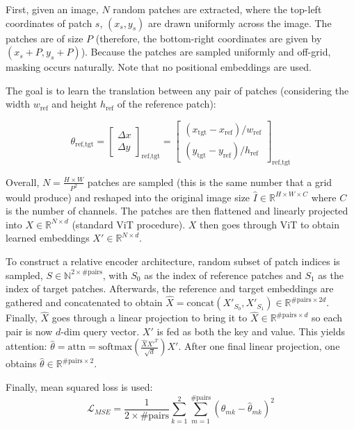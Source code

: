 \documentclass[final_report.tex]{subfiles}
\begin{document}
First, given an image, $N$ random patches are extracted, where the top-left coordinates of patch $s$, $(x_s,y_s)$ are drawn uniformly across the image. The patches are of size $P$ (therefore, the bottom-right coordinates are given by $(x_s+P,y_s+P)$). Because the patches are sampled uniformly and off-grid, masking occurs naturally. Note that no positional embeddings are used.

The goal is to learn the translation between any pair of patches (considering the width $w_\text{ref}$ and height $h_\text{ref}$ of the reference patch):

$$\theta_{\text{ref},\text{tgt}}=\begin{bmatrix} \Delta x \\ \Delta y \end{bmatrix}_{\text{ref},\text{tgt}}=\begin{bmatrix} (x_\text{tgt}-x_\text{ref})/w_{\text{ref}} \\ (y_\text{tgt}-y_\text{ref})/h_\text{ref} \end{bmatrix}_{\text{ref},\text{tgt}}$$

Overall, $N=\frac{H\times W}{P^2}$ patches are sampled (this is the same number that a grid would produce) and reshaped into the original image size $\hat{I}\in \mathbb{R}^{H\times W\times C}$ where $C$ is the number of channels. The patches are then flattened and linearly projected into $X\in\mathbb{R}^{N\times d}$ (standard ViT procedure). $X$ then goes through ViT to obtain learned embeddings $X'\in \mathbb{R}^{N\times d}$.

To construct a relative encoder architecture, random subset of patch indices is sampled, $S\in\mathbb{N}^{2\times \#\text{pairs}}$, with $S_0$ as the index of reference patches and $S_1$ as the index of target patches. Afterwards, the reference and target embeddings are gathered and concatenated to obtain $\hat{X}=\text{concat}(X'_{S_0},X'_{S_1})\in\mathbb{R}^{\#\text{pairs}\times 2d}$. Finally, $\hat{X}$ goes through a linear projection to bring it to $\hat{X}\in \mathbb{R}^{\#\text{pairs}\times d}$ so each pair is now $d$-dim query vector. $X'$ is fed as both the key and value. This yields attention: $\hat{\theta}=\text{attn}=\text{softmax}(\frac{\hat{X}X'^T}{\sqrt{d}})X'$. After one final linear projection, one obtains $\hat{\theta}\in\mathbb{R}^{\#\text{pairs}\times2}$.

Finally, mean squared loss is used:
$$\mathcal{L}_{MSE}=\frac{1}{2\times\#\text{pairs}}\sum^2_{k=1}\sum^{\#\text{pairs}}_{m=1}(\theta_{mk}-\hat{\theta}_{mk})^2$$
\end{document}
